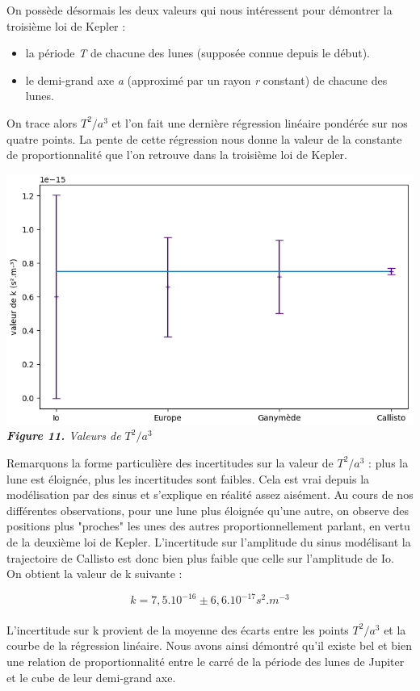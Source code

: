 \documentclass{aa}
\begin{document}
On possède désormais les deux valeurs qui nous intéressent pour démontrer la troisième loi de Kepler : 
\begin{itemize}
    \item la période \emph{T} de chacune des lunes (supposée connue depuis le début).
    \item le demi-grand axe \emph{a} (approximé par un rayon \emph{r} constant) de chacune des lunes.
\end{itemize}
On trace alors $T^2/a^3$ et l'on fait une dernière régression linéaire pondérée sur nos quatre points. La pente de cette régression nous donne la valeur de la constante de proportionnalité que l'on retrouve dans la troisième loi de Kepler.  
\begin{center}
    \includegraphics[scale = 0.62]{images/kepler.PNG}\\  
    \emph{{\textbf{Figure 11.} Valeurs de $T^2/a^3$}}
\end{center}
Remarquons la forme particulière des incertitudes sur la valeur de $T^2/a^3$ : plus la lune est éloignée, plus les incertitudes sont faibles. Cela est vrai depuis la modélisation par des sinus et s'explique en réalité assez aisément. Au cours de nos différentes observations, pour une lune plus éloignée qu'une autre, on observe des positions plus "proches" les unes des autres proportionnellement parlant, en vertu de la deuxième loi de Kepler. L'incertitude sur l'amplitude du sinus modélisant la trajectoire de Callisto est donc bien plus faible que celle sur l'amplitude de Io.\\
 On obtient la valeur de k suivante :
 
 \begin{equation}
     k = 7,5.10^{-16} \pm 6,6.10^{-17} s^{2}.m^{-3}
 \end{equation}\\
 L'incertitude sur k provient de la moyenne des écarts entre les points $T^2/a^3$ et la courbe de la régression linéaire.   
 Nous avons ainsi démontré qu'il existe bel et bien une relation de proportionnalité entre le carré de la période des lunes de Jupiter et le cube de leur demi-grand axe.\\
\end{document}
